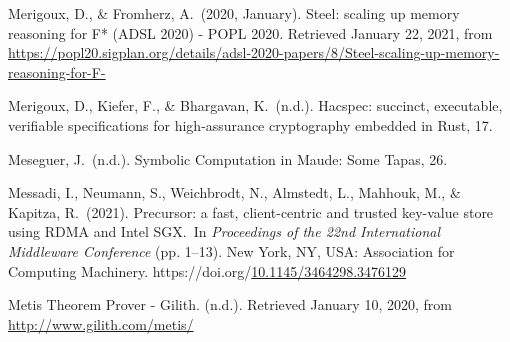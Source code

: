 \documentclass[12pt,twoside]{article}
\begin{document}
{\begin{thebibliography}{1079}
\mdbibitemlabel{}Merigoux, D., \& Fromherz, A.~(2020, January). Steel: scaling up memory reasoning for F* (ADSL 2020) - POPL 2020. Retrieved January 22, 2021, from \href{https://popl20.sigplan.org/details/adsl-2020-papers/8/Steel-scaling-up-memory-reasoning-for-F-}{{\ttfamily https://\hspace{0pt}popl20.\hspace{0pt}sigplan.\hspace{0pt}org/\hspace{0pt}details/\hspace{0pt}adsl-\hspace{0pt}2020-\hspace{0pt}papers/\hspace{0pt}8/\hspace{0pt}Steel-\hspace{0pt}scaling-\hspace{0pt}up-\hspace{0pt}memory-\hspace{0pt}reasoning-\hspace{0pt}for-\hspace{0pt}F-\hspace{0pt}}}%

\mdbibitemlabel{}Merigoux, D., Kiefer, F., \& Bhargavan, K.~(n.d.). Hacspec: succinct, executable, verifiable specifications for high-assurance cryptography embedded in Rust, 17.%

\mdbibitemlabel{}Meseguer, J.~(n.d.). Symbolic Computation in Maude: Some Tapas, 26.%

\mdbibitemlabel{}Messadi, I., Neumann, S., Weichbrodt, N., Almstedt, L., Mahhouk, M., \& Kapitza, R.~(2021). Precursor: a fast, client-centric and trusted key-value store using RDMA and Intel SGX.~In \emph{Proceedings of the 22nd International Middleware Conference} (pp. 1–13). New York, NY, USA: Association for Computing Machinery. https://doi.org/\href{https://dx.doi.org/10.1145/3464298.3476129}{10.1145/3464298.3476129}%

\mdbibitemlabel{}Metis Theorem Prover - Gilith. (n.d.). Retrieved January 10, 2020, from \href{http://www.gilith.com/metis/}{{\ttfamily http://\hspace{0pt}www.\hspace{0pt}gilith.\hspace{0pt}com/\hspace{0pt}metis/\hspace{0pt}}}%


\end{thebibliography}}
\end{document}
